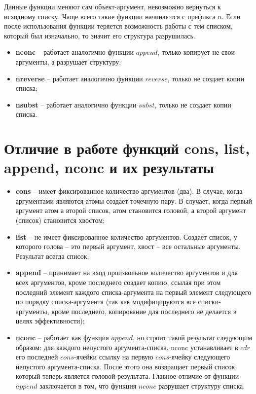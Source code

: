 \documentclass[a4paper,14pt, unknownkeysallowed]{extreport}
\begin{document}
Данные функции меняют сам объект-аргумент, невозможно вернуться к исходному списку. Чаще всего такие функции начинаются с префикса $n$. Если после использования функции теряется возможность работы с тем списком, который был изначально, то значит его структура разрушилась.

\begin{itemize}
	\item \textbf{nconc} -- работает аналогично функции $append$, только копирует не свои аргументы, а разрушает структуру;
	\item \textbf{nreverse} -- работает аналогично функции $reverse$, только не создает копии списка;
	\item \textbf{nsubst} -- работает аналогично функции $subst$, только не создает копии списка.
\end{itemize}

\section{Отличие в работе функций cons, list, append, nconc и их результаты}

\begin{itemize}
	\item \textbf{cons} -- имеет фиксированное количество аргументов (два). В случае, когда аргументами являются атомы создает точечную пару. В случает, когда первый аргумент атом а второй список, атом становится головой, а второй аргумент (список) становится хвостом;
	\item \textbf{list} -- не имеет фиксированное количество аргументов. Создает список, у которого голова -- это первый аргумент, хвост -- все остальные аргументы. Результат всегда список;
	\item \textbf{append} -- принимает на вход произвольное количество аргументов и для всех аргументов, кроме последнего создает копию, ссылая при этом последний элемент каждого списка-аргумента на первый элемент следующего по порядку списка-аргумента (так как модифицируются все списки-аргументы, кроме последнего, копирование для последнего не делается в целях эффективности);
	\item \textbf{nconc} -- работает как функция $append$, но строит такой результат следующим образом: для каждого непустого аргумента-списка, nconc устанавливает в $cdr$ его последней $cons$-ячейки ссылку на первую $cons$-ячейку следующего непустого аргумента-списка. После этого она возвращает первый список, который теперь является головой результата. Главное отличие от функции $append$ заключается в том, что функция $nconc$ разрушает структуру списка.
\end{itemize}
\end{document}
